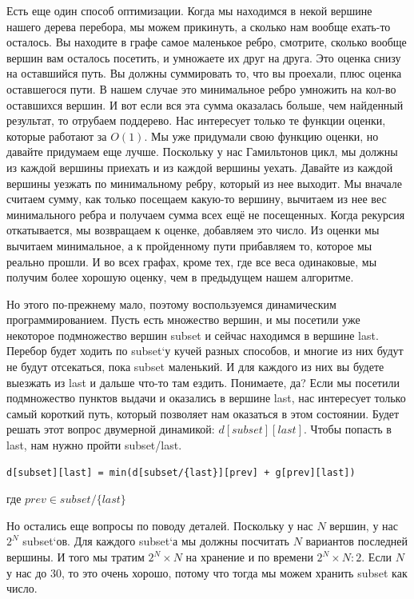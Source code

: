 \documentclass[12pt]{article}
\begin{document}
Есть еще один способ оптимизации. Когда мы находимся в некой вершине нашего дерева перебора, мы можем прикинуть, а сколько нам вообще ехать-то осталось. Вы находите в графе самое маленькое ребро, смотрите, сколько вообще вершин вам осталось посетить, и умножаете их друг на друга. Это оценка снизу на оставшийся путь. Вы должны суммировать то, что вы проехали, плюс оценка оставшегося пути. В нашем случае это минимальное ребро умножить на кол-во оставшихся вершин. И вот если вся эта сумма оказалась больше, чем найденный результат, то отрубаем поддерево. Нас интересует только те функции оценки, которые работают за $O(1)$. Мы уже придумали свою функцию оценки, но давайте придумаем еще лучше. Поскольку у нас Гамильтонов цикл, мы должны из каждой вершины приехать и из каждой вершины уехать. Давайте из каждой вершины уезжать по минимальному ребру, который из нее выходит. Мы вначале считаем сумму, как только посещаем какую-то вершину, вычитаем из нее вес минимального ребра и получаем сумма всех ещё не посещенных. Когда рекурсия откатывается, мы возвращаем к оценке, добавляем это число. Из оценки мы вычитаем минимальное, а к пройденному пути прибавляем то, которое мы реально прошли. И во всех графах, кроме тех, где все веса одинаковые, мы получим более хорошую оценку, чем в предыдущем нашем алгоритме.

Но этого по-прежнему мало, поэтому воспользуемся динамическим программированием. Пусть есть множество вершин, и мы посетили уже некоторое подмножество вершин subset и сейчас находимся в вершине last. Перебор будет ходить по subset`у кучей разных способов, и многие из них будут не будут отсекаться, пока subset маленький. И для каждого из них вы будете выезжать из last и дальше что-то там ездить. Понимаете, да? Если мы посетили подмножество пунктов выдачи и оказались в вершине last, нас интересует только самый короткий путь, который позволяет нам оказаться в этом состоянии. Будет решать этот вопрос двумерной динамикой: $d[subset][last]$. Чтобы попасть в last, нам нужно пройти subset/{last}.

\begin{verbatim}
d[subset][last] = min(d[subset/{last}][prev] + g[prev][last])
\end{verbatim}
где $prev \in  subset/\{last\}$

Но остались еще вопросы по поводу деталей. Поскольку у нас $N$ вершин, у нас $2^N$ subset`ов. Для каждого subset`а мы должны посчитать $N$ вариантов последней вершины. И того мы тратим $2^N \times N$ на хранение и по времени $2^N \times N:2$. Если $N$ у нас до $30$, то это очень хорошо, потому что тогда мы можем хранить subset как число. 
\end{document}
